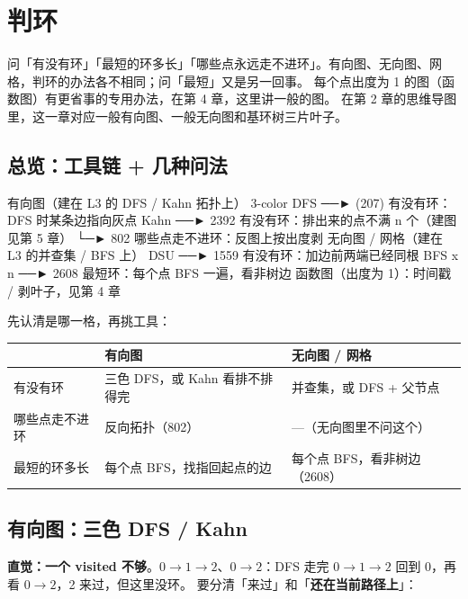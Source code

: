 \section{判环}

问「有没有环」「最短的环多长」「哪些点永远走不进环」。有向图、无向图、网格，判环的办法各不相同；问「最短」又是另一回事。
每个点出度为 1 的图（函数图）有更省事的专用办法，在第 4 章，这里讲一般的图。
在第 2 章的思维导图里，这一章对应一般有向图、一般无向图和基环树三片叶子。

\subsection{总览：工具链 + 几种问法}

\begin{overview}
有向图（建在 L3 的 DFS / Kahn 拓扑上）
  3-color DFS ──► (207)   有没有环：DFS 时某条边指向灰点
  Kahn        ──► 2392    有没有环：排出来的点不满 n 个（建图见第 5 章）
              └─► 802     哪些点走不进环：反图上按出度剥
无向图 / 网格（建在 L3 的并查集 / BFS 上）
  DSU         ──► 1559    有没有环：加边前两端已经同根
  BFS x n     ──► 2608    最短环：每个点 BFS 一遍，看非树边
函数图（出度为 1）：时间戳 / 剥叶子，见第 4 章
\end{overview}

先认清是哪一格，再挑工具：

\begin{center}\small
\begin{tabular}{@{}l l l@{}}
\toprule
& \textbf{有向图} & \textbf{无向图 / 网格}\\
\midrule
有没有环 & 三色 DFS，或 Kahn 看排不排得完 & 并查集，或 DFS + 父节点\\
哪些点走不进环 & 反向拓扑（802） & —（无向图里不问这个）\\
最短的环多长 & 每个点 BFS，找指回起点的边 & 每个点 BFS，看非树边（2608）\\
\bottomrule
\end{tabular}
\end{center}

\subsection{有向图：三色 DFS / Kahn}

\textbf{直觉：一个 visited 不够}。$0 \to 1 \to 2$、$0 \to 2$：DFS 走完 $0 \to 1 \to 2$ 回到 0，再看 $0 \to 2$，2 来过，但这里没环。
要分清「来过」和「\textbf{还在当前路径上}」：

